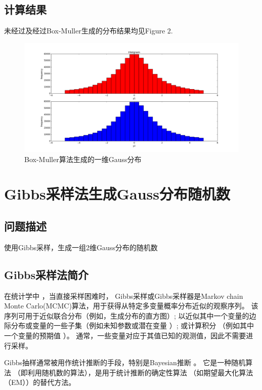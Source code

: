 \documentclass[twoside,twocolumn]{article}
\begin{document}
\begin{CJK*}{UTF8}{gkai}
\subsection{计算结果}
	未经过及经过Box-Muller生成的分布结果均见Figure 2.
\begin{figure}[h]
\centering
\includegraphics[width=1.0\linewidth]{figure/box-muller}
\caption{Box-Muller算法生成的一维Gauss分布}
\label{fig:box-muller}
\end{figure}

\section{Gibbs采样法生成Gauss分布随机数}
	\subsection{问题描述}
		使用Gibbs采样，生成一组2维Gauss分布的随机数
	\subsection{Gibbs采样法简介}
	在统计学中 ，当直接采样困难时， Gibbs采样或Gibbs采样器是Markov chain Monte Carlo(MCMC)算法，用于获得从特定多变量概率分布近似的观察序列。 该序列可用于近似联合分布（例如，生成分布的直方图）; 以近似其中一个变量的边际分布或变量的一些子集（例如未知参数或潜在变量 ）; 或计算积分 （例如其中一个变量的预期值 ）。 通常，一些变量对应于其值已知的观测值，因此不需要进行采样。
	
	Gibbs抽样通常被用作统计推断的手段，特别是Bayesian推断 。 它是一种随机算法 （即利用随机数的算法），是用于统计推断的确定性算法 （如期望最大化算法 （EM））的替代方法。
	

\end{CJK*}
\end{document}
